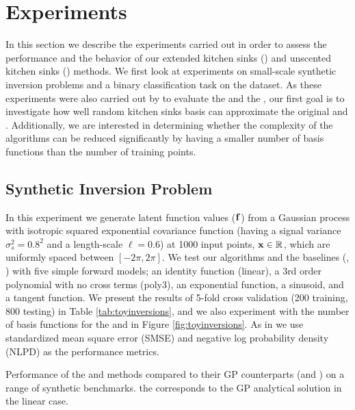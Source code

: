 \section{Experiments}
%
In this section we describe the experiments carried out in order to assess 
the performance and the behavior of our extended kitchen sinks (\eks) and 
unscented kitchen sinks (\uks) methods. We first look at experiments on 
small-scale synthetic inversion problems and a binary classification task on 
the \usps dataset. As these experiments were also carried out by 
\citet{steinberg-bonilla-nips-2014} to evaluate the \egp and the \ugp, 
our first goal  is to investigate how well 
random kitchen sinks basis can approximate the original \egp and \ugp.
Additionally, we are interested in determining whether the complexity 
of the algorithms  can be reduced significantly by having a smaller number 
of basis functions than the number of training points.
%
\subsection{Synthetic Inversion Problem}
In this experiment we generate latent function values ($\mathbf{f}$) from a
Gaussian process with isotropic squared exponential covariance function (having
a signal variance  $\sigma^2_s = 0.8^2$ and a length-scale $\ell = 0.6$) at
1000 input points, $\mathbf{x} \in \mathbb{R}^{}$, which are uniformly spaced between
$[-2\pi, 2\pi]$. We test our algorithms and the baselines (\ugp, \egp) with
five simple forward models; an identity function (linear), a 3rd order
polynomial with no cross terms (poly3), an exponential function, a sinusoid,
and a tangent function. We present the results of 5-fold cross validation (200
training, 800 testing) in Table \ref{tab:toyinversions}, and we also experiment
with the number of basis functions for the \eks and \uks in
Figure \ref{fig:toyinversions}. As in \citet{steinberg-bonilla-nips-2014} we
use standardized mean square error (SMSE) and negative log probability density
(NLPD) as the performance metrics. 
%
\begin{table}[h]
\caption{Performance of the \eks and \uks methods compared to their GP counterparts (\egp and \ugp) on a range of synthetic benchmarks. 
\gp the corresponds to the GP analytical solution in the linear case.
\label{tab:toyinversions}
}

\begin{center}
\begin{scriptsize}

\end{scriptsize}
\end{center}
\end{table}

